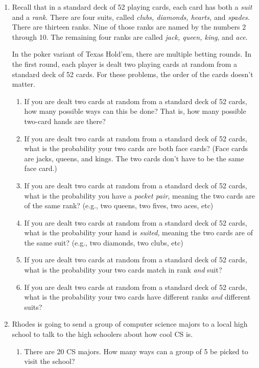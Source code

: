 \documentclass[11pt, letterpaper]{report}
\begin{document}
\begin{enumerate}

\item Recall that in a standard deck of 52 playing cards, each card has both a \emph{suit}
and a \emph{rank}.  There are four suits, called \emph{clubs, diamonds, hearts,} and \emph{spades}.
There are thirteen ranks.  Nine of those ranks are named by the numbers 2 through 10.
The remaining four ranks are called \emph{jack, queen, king}, and \emph{ace}.  


In the poker variant of Texas Hold'em, there are multiple betting rounds.  In the first round, each player is dealt two playing cards at random 
from a standard deck of 52 cards.  For these problems, the order of the cards doesn't matter.
\begin{enumerate}
	\item If you are dealt two cards at random from a standard deck of 52 cards, how many possible ways can this be done?  That is, how many possible two-card hands
	are there?
	\item If you are dealt two cards at random from a standard deck of 52 cards, what is the probability your two cards are both face cards?  (Face cards are
	jacks, queens, and kings.  The two cards don't have to be the same face card.)
	\item If you are dealt two cards at random from a standard deck of 52 cards, what is the probability you have a \emph{pocket pair}, meaning the two
	cards are of the same rank?  (e.g., two queens, two fives, two aces, etc)
	\item If you are dealt two cards at random from a standard deck of 52 cards, what is the probability your hand is \emph{suited}, meaning the two cards
	are of the same suit?  (e.g., two diamonds, two clubs, etc)
	\item If you are dealt two cards at random from a standard deck of 52 cards, what is the probability your two cards match in rank \emph{and} suit?
	\item If you are dealt two cards at random from a standard deck of 52 cards, what is the probability your two cards have different ranks \emph{and} different suits?
	
	
	
	\end{enumerate}




\item Rhodes is going to send a group of computer science majors to a local high school
to talk to the high schoolers about how cool CS is.  
\begin{enumerate}
        \item There are 20 CS majors.  How many ways can a group of 5 be picked to visit the 
        school?
        

\end{enumerate}
\end{enumerate}
\end{document}
